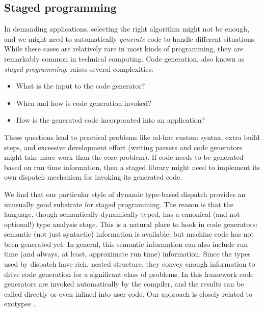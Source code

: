 \subsection{Staged programming}

In demanding applications, selecting the right algorithm might not
be enough, and we might need to automatically \emph{generate} code
to handle different situations. While these cases are relatively rare
in most kinds of programming, they are remarkably common in technical
computing. Code generation, also known as \emph{staged programming},
raises several complexities:

\vspace{-3ex}
\begin{singlespace}
\begin{itemize}
\item What is the input to the code generator?
\item When and how is code generation invoked?
\item How is the generated code incorporated into an application?
\end{itemize}
\end{singlespace}

\noindent
These questions lead to practical problems like ad-hoc custom syntax,
extra build steps, and excessive development effort (writing parsers and
code generators might take more work than the core problem).
If code needs to be generated based on run time information, then a
staged library might need to implement its own dispatch mechanism
for invoking its generated code.

We find that our particular style of dynamic type-based dispatch provides
an unusually good substrate for staged programming.
The reason is that the language, though semantically dynamically typed,
has a canonical (and not optional!) type analysis stage.
This is a natural place to hook in code generators: semantic (not just
syntactic) information is available, but machine code has not been
generated yet.
In general, this semantic information can also include run time (and
always, at least, approximate run time) information.
Since the types used by dispatch have rich, nested structure, they
convey enough information to drive code generation for a significant
class of problems.
In this framework code generators are invoked automatically by
the compiler, and the results can be called directly or even inlined
into user code.
Our approach is closely related to exotypes
\cite{DeVito:2014:FRG:2594291.2594307}.



